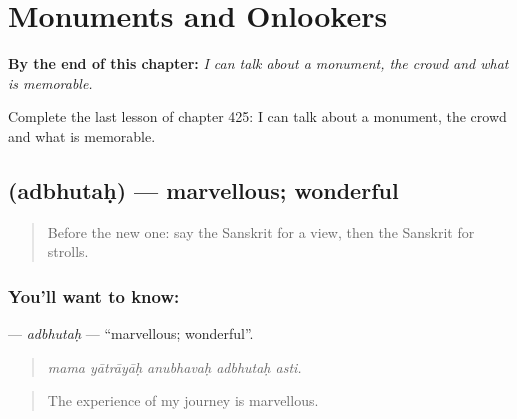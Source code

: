
\chapter{Monuments and Onlookers}
\label{ch:sa-monuments-and-onlookers}

\begin{chapteropening}
\textbf{By the end of this chapter:} \emph{I can talk about a monument, the crowd and what is memorable.}

Complete the last lesson of chapter 425: I can talk about a monument, the crowd and what is memorable.
\end{chapteropening}

\section[\texorpdfstring{\sk{अद्भुतः} (adbhutaḥ)}{अद्भुतः (adbhutaḥ)}]{ (adbhutaḥ) — marvellous; wonderful}

\label{lesson:SA-C425-adbhutah}



\begin{quote}
Before the new one: say the Sanskrit for a view, then the Sanskrit for strolls.
\end{quote}

\subsection*{You'll want to know: }
\textbf{} — \emph{adbhutaḥ} — \textquotedblleft{}marvellous; wonderful\textquotedblright{}.

\begin{quote}
    
\end{quote}

\begin{quote}
\emph{mama yātrāyāḥ anubhavaḥ adbhutaḥ asti.}
\end{quote}

\begin{quote}
The experience of my journey is marvellous.
\end{quote}

